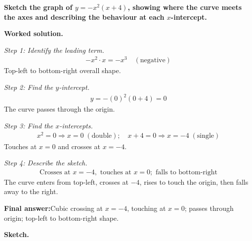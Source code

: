 \documentclass[11pt]{article}
\newcommand{\question}[1]{\par\medskip\noindent\textbf{#1}\par}
\begin{document}
\question{Sketch the graph of \( y = -x^2(x + 4) \), showing where the curve meets the axes and describing the behaviour at each \( x \)-intercept.}

\textbf{Worked solution.}

\textit{Step 1: Identify the leading term.}
\[\begin{gathered}
-x^2 \cdot x = -x^3 \quad (\text{negative})
\end{gathered}\]
Top-left to bottom-right overall shape.

\textit{Step 2: Find the \( y \)-intercept.}
\[\begin{gathered}
y = -(0)^2(0 + 4) = 0
\end{gathered}\]
The curve passes through the origin.

\textit{Step 3: Find the \( x \)-intercepts.}
\[\begin{gathered}
x^2 = 0 \Rightarrow x = 0 \;(\text{double}); \quad x + 4 = 0 \Rightarrow x = -4 \;(\text{single})
\end{gathered}\]
Touches at \( x = 0 \) and crosses at \( x = -4 \).

\textit{Step 4: Describe the sketch.}
\[\begin{gathered}
\text{Crosses at } x = -4, \text{ touches at } x = 0; \text{ falls to bottom-right}
\end{gathered}\]
The curve enters from top-left, crosses at \( -4 \), rises to touch the origin, then falls away to the right.

\begin{answerbox}
\textbf{Final answer:}\quad Cubic crossing at \(\displaystyle x = -4\), touching at \(\displaystyle x = 0\); passes through origin; top-left to bottom-right shape.
\end{answerbox}
\textbf{Sketch.}
\end{document}
